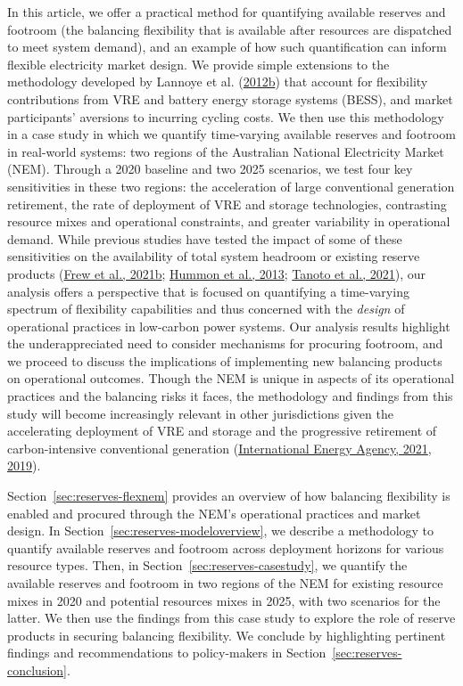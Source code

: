 \documentclass[12pt,a4paper,]{report}
\begin{document}
In this article, we offer a practical method for quantifying available
reserves and footroom (the balancing flexibility that is available after
resources are dispatched to meet system demand), and an example of how
such quantification can inform flexible electricity market design. We
provide simple extensions to the methodology developed by Lannoye et al.
(\protect\hyperlink{ref-lannoyeEvaluationPowerSystem2012}{2012b}) that
account for flexibility contributions from VRE and battery energy
storage systems (BESS), and market participants' aversions to incurring
cycling costs. We then use this methodology in a case study in which we
quantify time-varying available reserves and footroom in real-world
systems: two regions of the Australian National Electricity Market
(NEM). Through a 2020 baseline and two 2025 scenarios, we test four key
sensitivities in these two regions: the acceleration of large
conventional generation retirement, the rate of deployment of VRE and
storage technologies, contrasting resource mixes and operational
constraints, and greater variability in operational demand. While
previous studies have tested the impact of some of these sensitivities
on the availability of total system headroom or existing reserve
products
(\protect\hyperlink{ref-frewCurtailmentParadoxTransition2021}{Frew et
al., 2021b};
\protect\hyperlink{ref-hummonFundamentalDriversCost2013}{Hummon et al.,
2013}; \protect\hyperlink{ref-tanotoImpactHighSolar2021}{Tanoto et al.,
2021}), our analysis offers a perspective that is focused on quantifying
a time-varying spectrum of flexibility capabilities and thus concerned
with the \emph{design} of operational practices in low-carbon power
systems. Our analysis results highlight the underappreciated need to
consider mechanisms for procuring footroom, and we proceed to discuss
the implications of implementing new balancing products on operational
outcomes. Though the NEM is unique in aspects of its operational
practices and the balancing risks it faces, the methodology and findings
from this study will become increasingly relevant in other jurisdictions
given the accelerating deployment of VRE and storage and the progressive
retirement of carbon-intensive conventional generation
(\protect\hyperlink{ref-internationalenergyagencyNetZero20502021}{International
Energy Agency, 2021},
\protect\hyperlink{ref-internationalenergyagencyStatusPowerSystem2019}{2019}).

Section~\ref{sec:reserves-flexnem} provides an overview of how balancing
flexibility is enabled and procured through the NEM's operational
practices and market design. In
Section~\ref{sec:reserves-modeloverview}, we describe a methodology to
quantify available reserves and footroom across deployment horizons for
various resource types. Then, in Section~\ref{sec:reserves-casestudy},
we quantify the available reserves and footroom in two regions of the
NEM for existing resource mixes in 2020 and potential resources mixes in
2025, with two scenarios for the latter. We then use the findings from
this case study to explore the role of reserve products in securing
balancing flexibility. We conclude by highlighting pertinent findings
and recommendations to policy-makers in
Section~\ref{sec:reserves-conclusion}.
\end{document}
